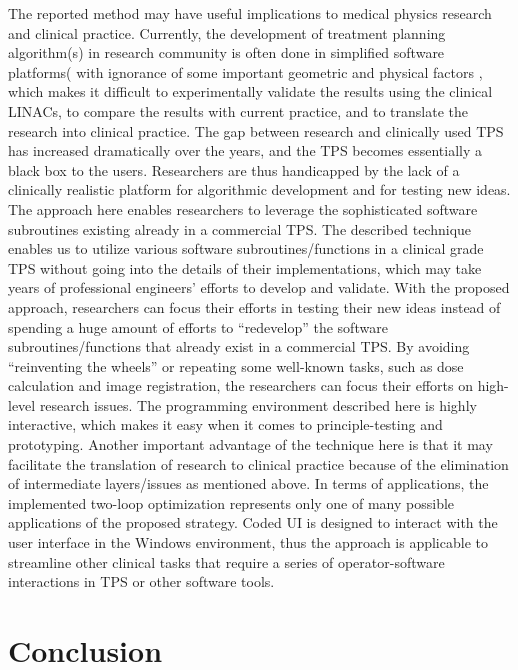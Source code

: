 The reported method may have useful implications to medical physics research and clinical practice. Currently, the development of treatment planning algorithm(s) in research community is often done in simplified software platforms(\cite{deasy2003, tewell2004} with ignorance of some important geometric and physical factors \cite{deasy2003, kim2015}, which makes it difficult to experimentally validate the results using the clinical LINACs, to compare the results with current practice, and to translate the research into clinical practice. The gap between research and clinically used TPS has increased dramatically over the years, and the TPS becomes essentially a black box to the users. Researchers are thus handicapped by the lack of a clinically realistic platform for algorithmic development and for testing new ideas. The approach here enables researchers to leverage the sophisticated software subroutines existing already in a commercial TPS. The described technique enables us to utilize various software subroutines/functions in a clinical grade TPS without going into the details of their implementations, which may take years of professional engineers' efforts to develop and validate.  With the proposed approach, researchers can focus their efforts in testing their new ideas instead of spending a huge amount of efforts to ``redevelop'' the software subroutines/functions that already exist in a commercial TPS. By avoiding ``reinventing the wheels'' or repeating some well-known tasks, such as dose calculation and image registration, the researchers can focus their efforts on high-level research issues. The programming environment described here is highly interactive, which makes it easy when it comes to principle-testing and prototyping. Another important advantage of the technique here is that it may facilitate the translation of research to clinical practice because of the elimination of intermediate layers/issues as mentioned above. In terms of applications, the implemented two-loop optimization represents only one of many possible applications of the proposed strategy. Coded UI is designed to interact with the user interface in the Windows environment, thus the approach is applicable to streamline other clinical tasks that require a series of operator-software interactions in TPS or other software tools. 

\section{Conclusion}

